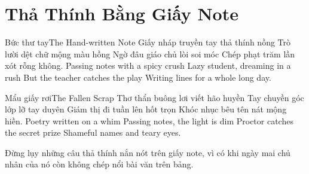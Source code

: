 \chapter{Thả Thính Bằng Giấy Note}

\begin{tutuyetbox}{Bức thư tay}{The Hand-written Note}
Giấy nháp truyền tay thả thính nồng
Trò lười dệt chữ mộng màu hồng
Ngờ đâu giáo chủ lòi soi móc
Chép phạt trăm lần xót rỗng không.
\tcblower
Passing notes with a spicy crush 
Lazy student, dreaming in a rush 
But the teacher catches the play 
Writing lines for a whole long day.
\end{tutuyetbox}

\begin{tutuyetbox}{Mẩu giấy rơi}{The Fallen Scrap}
Thơ thẩn buông lơi viết hão huyền
Tay chuyền góc lớp lỡ tay duyên
Giám thị đi tuần lên hốt trọn
Khóc nhục bêu tên nát mộng hiền.
\tcblower
Poetry written on a whim 
Passing notes, the light is dim 
Proctor catches the secret prize 
Shameful names and teary eyes.
\end{tutuyetbox}

\begin{ghichu}
Đừng lụy những câu thả thính nắn nót trên giấy note, vì có khi ngày mai chủ nhân của nó còn không chép nổi bài văn trên bảng.
\end{ghichu}